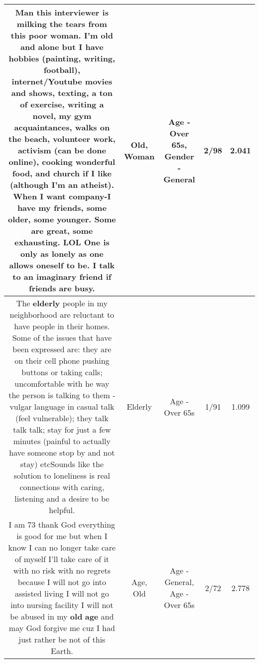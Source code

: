 \documentclass[11pt]{article}
\newlength\mylength
\begin{document}
\begin{center}
\begin{longtable}{|C{.65\mylength}|C{.30\mylength}|C{.12\mylength}|C{.12\mylength}|C{.12\mylength}|}
  \small Man this interviewer is milking the tears from this poor \textbf{woman}. I'm \textbf{old} and alone but I have hobbies (painting, writing, football), internet/Youtube movies and shows, texting, a ton of exercise, writing a novel, my gym acquaintances, walks on the beach, volunteer work, activism (can be done online), cooking wonderful food, and church if I like (although I'm an atheist). When I want company-I have my friends, some older, some younger. Some are great, some exhausting. LOL One is only as lonely as one allows oneself to be. I talk to an imaginary friend if friends are busy.\normalsize   & Old, Woman & Age - Over 65s, Gender - General & 2/98 & 2.041 \\  \hline
  \small The \textbf{elderly} people in my neighborhood are reluctant to have people in their homes. Some of the issues that have been expressed are: they are on their cell phone pushing buttons or taking calls; uncomfortable with he way the person is talking to them - vulgar language in casual talk (feel vulnerable); they talk talk talk; stay for just a few minutes (painful to actually have someone stop by and not stay) etcSounds like the solution to loneliness is real connections with caring, listening and a desire to be helpful.\normalsize   & Elderly & Age - Over 65s & 1/91 & 1.099 \\  \hline
  \small I am 73 thank God everything is good for me but when I know I can no longer take care of myself I'll take care of it with no risk with no regrets because I will not go into assisted living I will not go into nursing facility I will not be abused in my \textbf{old} \textbf{age} and may God forgive me cuz I had just rather be not of this Earth.\normalsize   & Age, Old & Age - General, Age - Over 65s & 2/72 & 2.778 \\  \hline

\end{longtable}
\end{center}
\end{document}
